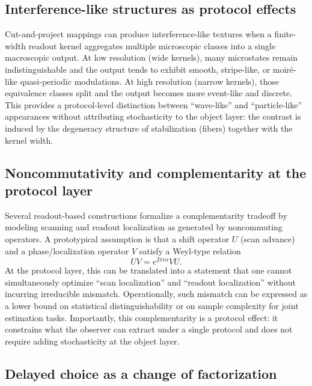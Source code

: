 \subsection{Interference-like structures as protocol effects}\label{sec:causality:interference}

Cut-and-project mappings can produce interference-like textures when a finite-width readout kernel aggregates multiple microscopic classes into a single macroscopic output. At low resolution (wide kernels), many microstates remain indistinguishable and the output tends to exhibit smooth, stripe-like, or moir\'e-like quasi-periodic modulations. At high resolution (narrow kernels), those equivalence classes split and the output becomes more event-like and discrete. This provides a protocol-level distinction between ``wave-like'' and ``particle-like'' appearances without attributing stochasticity to the object layer: the contrast is induced by the degeneracy structure of stabilization (fibers) together with the kernel width.

\subsection{Noncommutativity and complementarity at the protocol layer}\label{sec:causality:complementarity}

Several readout-based constructions formalize a complementarity tradeoff by modeling scanning and readout localization as generated by noncommuting operators. A prototypical assumption is that a shift operator $U$ (scan advance) and a phase/localization operator $V$ satisfy a Weyl-type relation
\[
UV=e^{2\pi i \alpha}VU.
\]
 \cite{Weyl1931,vonNeumann1932}
At the protocol layer, this can be translated into a statement that one cannot simultaneously optimize ``scan localization'' and ``readout localization'' without incurring irreducible mismatch. Operationally, such mismatch can be expressed as a lower bound on statistical distinguishability or on sample complexity for joint estimation tasks. Importantly, this complementarity is a protocol effect: it constrains what the observer can extract under a single protocol and does not require adding stochasticity at the object layer.

\subsection{Delayed choice as a change of factorization}\label{sec:causality:delayed-choice}

